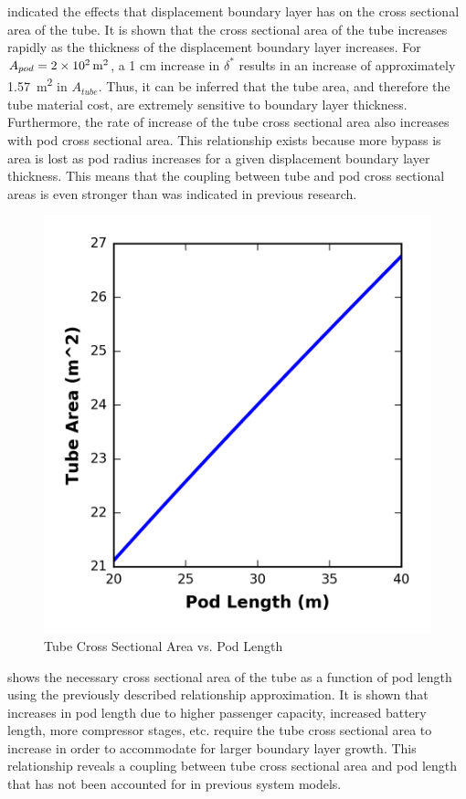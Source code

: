  indicated the effects that displacement boundary layer has on the cross sectional area of the tube. It is shown that the cross sectional area of the tube increases rapidly as the thickness of the displacement boundary layer increases. For $A_{pod} = \SI{2d2}{\metre\squared}$, a 1 cm increase in $\delta^{*}$ results in an increase of approximately \SI{1.57}{\metre\squared} in $A_{tube}$. Thus, it can be inferred that the tube area, and therefore the tube material cost, are extremely sensitive to boundary layer thickness. Furthermore, the rate of increase of the tube cross sectional area also increases with pod cross sectional area. This relationship exists because more bypass is area is lost as pod radius increases for a given displacement boundary layer thickness. This means that the coupling between tube and pod cross sectional areas is even stronger than was indicated in previous research.
\begin{figure}
	\centering
	\caption{Tube Cross Sectional Area vs. Pod Length}
	\label{fig:tube_area_vs_length}
	\includegraphics{../../images/graphs/boundary_layer_length_trades/Tube_Area_vs_pod_length.png}
\end{figure}
 shows the necessary cross sectional area of the tube as a function of pod length using the previously described relationship approximation. It is shown that increases in pod length due to higher passenger capacity, increased battery length, more compressor stages, etc. require the tube cross sectional area to increase in order to accommodate for larger boundary layer growth. This relationship reveals a coupling between tube cross sectional area and pod length that has not been accounted for in previous system models.
